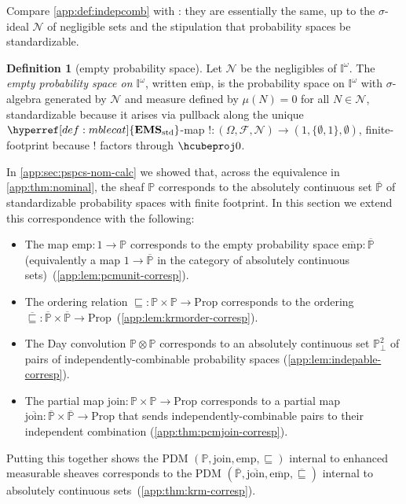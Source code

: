 \documentclass[
  sigconf,
  screen, ]{acmart}
\theoremstyle{definition}
\newtheorem{definition}[theorem]{Definition}
\newcommand\calF{\mathcal F}
\newcommand\calN{\mathcal N}
\newcommand\lilact[2]{\citet[\href{https://johnm.li/lilac.pdf\#page=#2}{#1}]{li2023lilac}}
\newcommand\nref[2]{\hyperref[#1]{#2}} \newcommand\checkhigh{{\huge{\color{red}\textbf{TODO: check}}}}
\newcommand\shotimes{\mathop{\otimes}}
\newcommand\texhcube{{{{\mathbb I}^\omega}}}
\newcommand\hcube{{\nref{def:hcube}{\texhcube}}}
\newcommand\texagoodname{absolutely continuous set}
\newcommand\agoodname{\texagoodname}
\newcommand\aagoodname{an \texagoodname}
\newcommand\sheafcatadj{enhanced measurable}
\newcommand\texgoodsheaves{\sheafcatadj{} sheaves}
\newcommand\goodsheaves{\texgoodsheaves}
\newcommand\texStdMble{\mathbf{EMS}_{\rm std}}
\newcommand\StdMble{{\nref{def:mblecat}{\texStdMble}}}
\newcommand\Prop{{\nref{prop:ext-ren-inv-prop}{\mathrm{Prop}}}}
\newcommand\pcmjoin{{\nref{app:def:pspcs-tensor-join}{\mathrm{join}}}}
\newcommand\pcmunit{{\nref{app:def:pspcs-join-unit}{\mathrm{emp}}}}
\newcommand\texpspcs{\mathbb P}
\newcommand\pspcs{{\nref{def:mble-pspcs}{\texpspcs}}}
\newcommand\gProp{{\mathrm{Prop}}}
\newcommand\gpcmjoin{{\nref{app:def:gpspcs-join}{\overline{\mathrm{join}}}}}
\newcommand\gpcmunit{{\nref{app:def:emp-gpspcs}{\overline{\mathrm{emp}}}}}
\newcommand\gkrmorder{\mathbin{\nref{app:def:pspc-ord}{\overline{\sqsubseteq}}}}
\newcommand\texgpspcs{\overline{\mathbb P}}
\newcommand\gpspcs{{\nref{def:gpspcs}{\texgpspcs}}}
\newcommand\krmorder{\mathrel{\nref{app:def:mble-pspcs-ordering}{\sqsubseteq}}}
\begin{document}
Compare \cref{app:def:indepcomb} with \lilact{Definition 2.2}{10}:
they are essentially the same, 
up to the $\sigma$-ideal
$\calN$ of negligible sets and the stipulation that probability spaces
be standardizable.

\begin{definition}[empty probability space] \label{app:def:emp-gpspcs}
  Let $\calN$ be the negligibles of $\hcube$.
  The \emph{empty probability space on $\hcube$},
  written $\gpcmunit$, is the probability space on $\hcube$
  with $\sigma$-algebra generated by $\calN$
  and measure defined by $\mu(N) = 0$ for all $N\in\calN$,
  standardizable because it arises via pullback 
  along the unique $\StdMble$-map $! : (\Omega,\calF,\calN)\to (1,\{\emptyset,1\},\emptyset)$,
  finite-footprint because $!$ factors through $\hcubeproj 0$.
\end{definition}

\newcommand\indepable{{\nref{app:def:indepable}{{\mathbb P}^2_{\perp}}}}

In \cref{app:sec:pspcs-nom-calc}
we showed that, across the equivalence in \cref{app:thm:nominal},
the sheaf $\pspcs$ corresponds to the \agoodname{}
$\gpspcs$ of standardizable probability spaces with finite footprint.
In this section we extend this correspondence with the following: \begin{itemize}
  \item The map $\pcmunit : 1\to \pspcs$
     corresponds to the empty probability space $\gpcmunit : \gpspcs$
     (equivalently a map $1\to\gpspcs$ in the category of \agoodname{s})~(\cref{app:lem:pcmunit-corresp}).
  \item The ordering relation $\krmorder : \pspcs\times\pspcs\to\Prop$ 
    corresponds to the ordering $\gkrmorder : \overline\pspcs\times\overline\pspcs\to\Prop$~(\cref{app:lem:krmorder-corresp}).
  \item The Day convolution $\pspcs\shotimes\pspcs$ corresponds to
    \aagoodname{} $\indepable$ of pairs of independently-combinable probability spaces (\cref{app:lem:indepable-corresp}).
  \item The partial map $\pcmjoin : \pspcs\times\pspcs\to\Prop$ corresponds to
    a partial map $\gpcmjoin : \gpspcs\times\gpspcs\to\gProp$
    that sends
    independently-combinable pairs to their independent combination (\cref{app:thm:pcmjoin-corresp}).
\end{itemize}
Putting this together shows the PDM $(\pspcs,\pcmjoin,\pcmunit,\krmorder)$
internal to \goodsheaves{}
corresponds to the PDM $(\gpspcs,\gpcmjoin,\gpcmunit,\gkrmorder)$
internal to \agoodname{s}~(\cref{app:thm:krm-corresp}).
\end{document}
